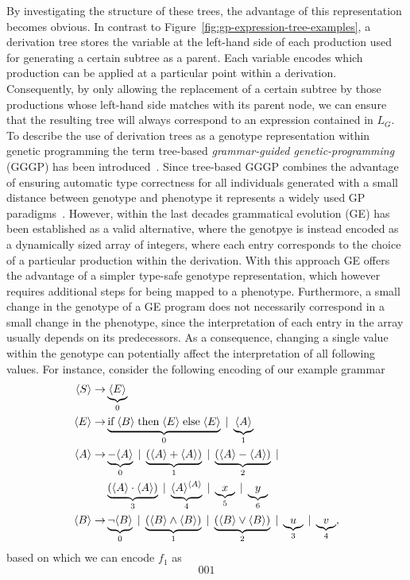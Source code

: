By investigating the structure of these trees, the advantage of this representation becomes obvious.
In contrast to Figure~\ref{fig:gp-expression-tree-examples}, a derivation tree stores the variable at the left-hand side of each production used for generating a certain subtree as a parent.
Each variable encodes which production can be applied at a particular point within a derivation.
Consequently, by only allowing the replacement of a certain subtree by those productions whose left-hand side matches with its parent node, we can ensure that the resulting tree will always correspond to an expression contained in $L_G$. 
To describe the use of derivation trees as a genotype representation within genetic programming the term tree-based \emph{grammar-guided genetic-programming} (GGGP) has been introduced~\cite{mckay2010grammar}.
Since tree-based GGGP combines the advantage of ensuring automatic type correctness for all individuals generated with a small distance between genotype and phenotype it represents a widely used GP paradigms~\cite{mckay2010grammar}.
However, within the last decades grammatical evolution (GE) has been established as a valid alternative, where the genotpye is instead encoded as a dynamically sized array of integers, where each entry corresponds to the choice of a particular production within the derivation.
With this approach GE offers the advantage of a simpler type-safe genotype representation, which however requires additional steps for being mapped to a phenotype.
Furthermore, a small change in the genotype of a GE program does not necessarily correspond in a small change in the phenotype, since the interpretation of each entry in the array usually depends on its predecessors.
As a consequence, changing a single value within the genotype can potentially affect the interpretation of all following values.
For instance, consider the following encoding of our example grammar
\begin{equation}
	\begin{split}
		\langle S \rangle \to & \underbrace{\langle E \rangle}_{0} \\
		\langle E \rangle \to & \underbrace{\text{if} \; \langle B \rangle \; \text{then} \; \langle E \rangle \; \text{else} \; \langle E \rangle}_{0} \; | \; \underbrace{\langle A \rangle}_{1} \\
		\langle A \rangle \to & \underbrace{-\langle A \rangle}_0 \; | \; \underbrace{(\langle A \rangle + \langle A \rangle)}_{1} \; | \; \underbrace{(\langle A \rangle - \langle A \rangle)}_2 \; |   \\  
		& \underbrace{(\langle A \rangle \cdot \langle A \rangle)}_{3} \; | \; \underbrace{\langle A \rangle^{\langle A \rangle}}_{4} \; | \; \underbrace{x}_{5} \; | \; \underbrace{y}_{6} \\
		\langle B \rangle \to & \underbrace{\neg \langle B \rangle}_{0} \; | \; \underbrace{(\langle B \rangle \wedge \langle B \rangle)}_{1} \; | \; \underbrace{(\langle B \rangle \vee \langle B \rangle)}_{2} \; | \; \underbrace{u}_3 \; | \; \underbrace{v}_4,
	\end{split}
	\label{eq:gp-example-grammar-ge-encoding}
\end{equation}
based on which we can encode $f_1$ as
\begin{equation}
	0 0 1 
\end{equation}




